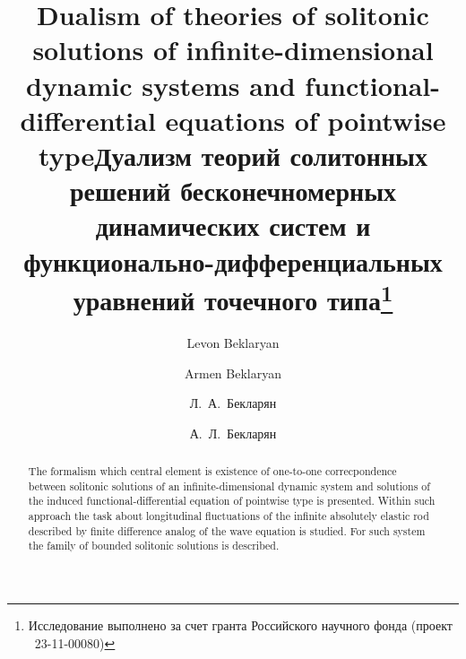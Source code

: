 \begin{englishtitle} %
\title{Dualism of theories of solitonic solutions of infinite-dimensional dynamic systems and functional- differential equations of pointwise type}
\author{Levon Beklaryan \and  Armen Beklaryan
}

\maketitle

\begin{abstract}
The formalism which central element is existence of one-to-one correcpondence  between solitonic solutions of an infinite-dimensional dynamic system and solutions of the induced functional-differential equation of pointwise type is presented. Within such approach the task about longitudinal fluctuations of the infinite absolutely elastic rod described  by finite  difference analog of the wave equation is studied. For such system the family of bounded solitonic solutions is described. 

\end{abstract}
\end{englishtitle}

\iffalse
\documentclass[12pt]{llncs} 
\usepackage{amsfonts,amsmath,array}
\usepackage{amssymb}


\usepackage{iftex}

\ifPDFTeX
\usepackage[T2A]{fontenc}
\usepackage[utf8]{inputenc} %
\usepackage[english,russian]{babel}
\fi

\usepackage{todonotes} 

\usepackage[russian]{nla}


\fi

\title{Дуализм теорий  солитонных решений бесконечномерных динамических систем и функционально-дифференциальных уравнений точечного типа\thanks{Исследование выполнено за счет гранта Российского научного фонда (проект \textnumero~23-11-00080)}}
\author{Л.~А.~Бекларян \and А.~Л.~Бекларян
}

